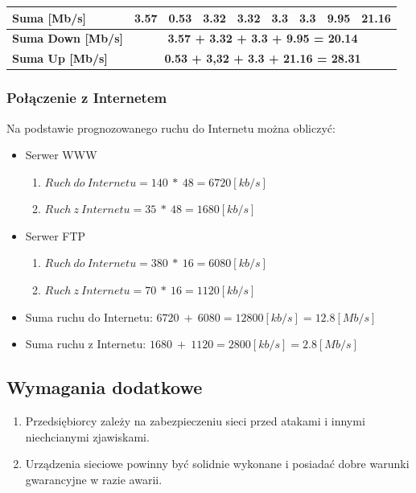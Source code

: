 \documentclass{article}
\begin{document}
\begin{table}[H]
\begin{tabular}{|l|c|c|c|c|c|c|c|c|}
		\textbf{Suma {[}Mb/s{]}}                                                                          & 3.57            & 0.53            & 3.32              & 3.32              & 3.3         & 3.3         & 9.95           & 21.16          \\ \hline
		\textbf{Suma Down {[}Mb/s{]}}                                                                     & \multicolumn{8}{c|}{\textbf{3.57 + 3.32 + 3.3 + 9.95 = 20.14}}                                                                          \\ \hline
		\textbf{Suma Up {[}Mb/s{]}}                                                                       & \multicolumn{8}{c|}{\textbf{0.53 + 3,32 + 3.3 + 21.16 = 28.31}}                                                                         \\ \hline
	\end{tabular}
\end{table}

\subsubsection{Połączenie z Internetem}
\par Na podstawie prognozowanego ruchu do Internetu można obliczyć:
\begin{itemize}
	\item Serwer WWW
	\begin{enumerate}
		\item $ Ruch \ do \ Internetu= 140 \  * \ 48 =  6720 [kb/s] $
		\item $ Ruch \ z \ Internetu= 35 \  * \ 48 = 1680 [kb/s] $
	\end{enumerate}
	\item Serwer FTP
	\begin{enumerate}
		\item $ Ruch \ do \ Internetu= 380 \  * \ 16 =  6080 [kb/s] $
		\item $ Ruch \ z \ Internetu= 70 \  * \ 16 = 1120 [kb/s] $
	\end{enumerate}
	\item Suma ruchu do Internetu: $ 6720 \ + \ 6080 = 12 800[kb/s] = 12.8 [Mb/s] $ 
	\item Suma ruchu z Internetu: $ 1680 \ + \ 1120 = 2 800[kb/s] = 2.8 [Mb/s] $ 
\end{itemize}

\subsection{Wymagania dodatkowe}
\begin{enumerate}
	\item Przedsiębiorcy zależy na zabezpieczeniu sieci przed atakami i innymi niechcianymi zjawiskami.
	\item Urządzenia sieciowe powinny być solidnie wykonane i posiadać dobre warunki gwarancyjne w razie awarii. 
\end{enumerate}
\end{document}
